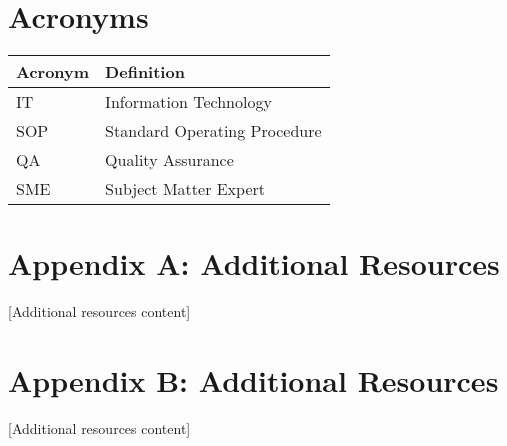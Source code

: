 \documentclass[12pt,letterpaper]{article}
\begin{document}
\clearpage
\section{Acronyms}
\begin{longtable}{|p{}|p{}|}
\hline
\textbf{Acronym} & \textbf{Definition} \\
\hline
IT & Information Technology \\
\hline
SOP & Standard Operating Procedure \\
\hline
QA & Quality Assurance \\
\hline
SME & Subject Matter Expert \\
\hline
\end{longtable}

\clearpage
\appendix
\section{Appendix A: Additional Resources}
[Additional resources content]

\clearpage
\section{Appendix B: Additional Resources}
[Additional resources content]
\end{document}
